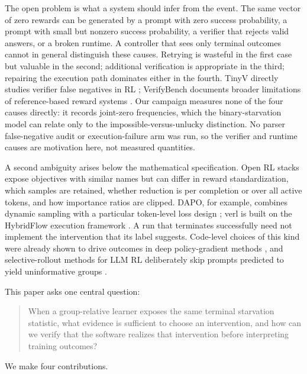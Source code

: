 \documentclass{article}
\begin{document}
The open problem is what a system should infer from the event.  The same vector
of zero rewards can be generated by a prompt with zero success probability, a
prompt with small but nonzero success probability, a verifier that rejects
valid answers, or a broken runtime.  A controller that sees only terminal
outcomes cannot in general distinguish these causes.  Retrying is wasteful in
the first case but valuable in the second; additional verification is
appropriate in the third; repairing the execution path dominates either in the
fourth.  TinyV directly studies verifier false negatives in RL
\citep{xu2025tinyv}; VerifyBench documents broader limitations of
reference-based reward systems \citep{yan2025verifybench}.  Our campaign
measures none of the four causes directly: it records joint-zero frequencies,
which the binary-starvation model can relate only to the impossible-versus-unlucky
distinction.  No parser false-negative audit or execution-failure arm was run,
so the verifier and runtime causes are motivation here, not measured quantities.

A second ambiguity arises below the mathematical specification.  Open RL stacks
expose objectives with similar names but can differ in reward standardization,
which samples are retained, whether reduction is per completion or over all
active tokens, and how importance ratios are clipped.  DAPO, for example,
combines dynamic sampling with a particular token-level loss design
\citep{yu2025dapo}; verl is built on the HybridFlow execution framework
\citep{sheng2024hybridflow}.  A run that terminates successfully need not
implement the intervention that its label suggests.  Code-level choices of this
kind were already shown to drive outcomes in deep policy-gradient methods
\citep{engstrom2020implementation}, and selective-rollout methods for LLM RL
deliberately skip prompts predicted to yield uninformative groups
\citep{zheng2025greso}.

This paper asks one central question:

\begin{quote}
When a group-relative learner exposes the same terminal starvation statistic,
what evidence is sufficient to choose an intervention, and how can we verify
that the software realizes that intervention before interpreting training
outcomes?
\end{quote}

We make four contributions.
\end{document}
